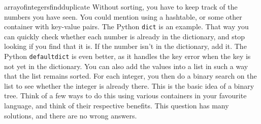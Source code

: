 \begin{answer}{arrayofintegersfindduplicate}
 Without sorting, you have to keep track of the numbers you have seen.
 You could mention using a hashtable, or some other container with key-value pairs.
 The Python \verb+dict+ is an example.
 That way you can quickly check whether each number is already in the dictionary, and stop looking if you find that it is.
 If the number isn't in the dictionary, add it.
 The Python \verb+defaultdict+ is even better, as it handles the key error when the key is not yet in the dictionary.
 You can also  add the values into a list in such a way that the list remains sorted.
 For each integer, you then do a binary search on the list to see whether the integer is already there.
 This is the basic idea of a binary tree.
 Think of a few ways to do this using various containers in your favourite language, and think of their respective benefits.
 This question has many solutions, and there are no wrong answers.


\end{answer}
